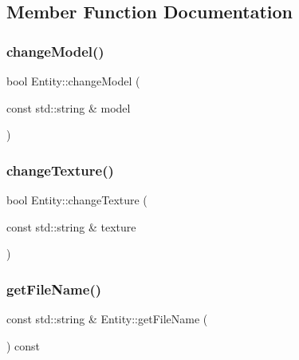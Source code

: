 \subsection{Member Function Documentation}
\mbox{\label{class_entity_a7af4a2f9d919f516d67be4d22a648cae}} 
\subsubsection{\texorpdfstring{changeModel()}{changeModel()}}
{\footnotesize\ttfamily bool Entity\+::change\+Model (\begin{DoxyParamCaption}\item[{const std\+::string \&}]{model }\end{DoxyParamCaption})}

\mbox{\label{class_entity_a4195b26c19b8c13e66f6bf723185d9ec}} 
\subsubsection{\texorpdfstring{changeTexture()}{changeTexture()}}
{\footnotesize\ttfamily bool Entity\+::change\+Texture (\begin{DoxyParamCaption}\item[{const std\+::string \&}]{texture }\end{DoxyParamCaption})}

\mbox{\label{class_entity_acd53c0e6262c3ca14e16358cb2108edc}} 
\subsubsection{\texorpdfstring{getFileName()}{getFileName()}}
{\footnotesize\ttfamily const std\+::string \& Entity\+::get\+File\+Name (\begin{DoxyParamCaption}{ }\end{DoxyParamCaption}) const}

\mbox{\label{class_entity_afae2e0444ed61facc55756887d725208}} 
